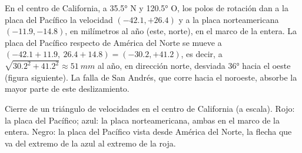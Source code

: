 \begin{example}\label{ex:g11:plate-motions:san-andreas}
En el centro de California, a \ang{35.5} N y \ang{120.5} O, los polos de
rotación dan a la placa del Pacífico la velocidad $(-42.1, +26.4)$ y a la
placa norteamericana $(-11.9, -14.8)$, en milímetros al año (este, norte), en
el marco de la  entera. La placa del Pacífico respecto de América del
Norte se mueve a $(-42.1 + 11.9,\ 26.4 + 14.8) = (-30.2, +41.2)$, es decir,
a $\sqrt{30.2^2 + 41.2^2} \approx \qty{51}{mm}$ al año, en dirección norte,
desviada \ang{36} hacia el oeste (figura siguiente). La falla de
San Andrés, que corre hacia el noroeste, absorbe la mayor parte de este
deslizamiento.
\end{example}

\begin{omfigure}

{\small Cierre de un triángulo de velocidades en el centro de California (a
escala). Rojo: la placa del Pacífico; azul: la placa norteamericana, ambas en
el marco de la  entera. Negro: la placa del Pacífico vista desde
América del Norte, la flecha que va del extremo de la azul al extremo de la
roja.}
\end{omfigure}

